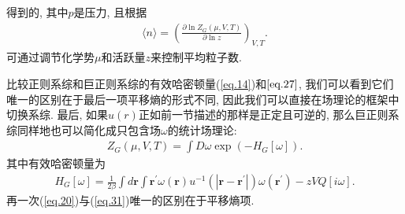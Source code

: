 得到的, 其中$p$是压力, 且根据
\label{subsec.equations}
   \begin{equation}
       \begin{aligned}
           \langle n \rangle=\left(\frac{\partial \ln Z_G(\mu, V, T)}{\partial \ln z}
           \right)_{V, T}.
       \end{aligned}
       \label{eq.29}      
    \end{equation}
可通过调节化学势$\mu$和活跃量$z$来控制平均粒子数.
\par
比较正则系综和巨正则系综的有效哈密顿量(\ref{eq.14})和$\ref{eq.27}$,
我们可以看到它们唯一的区别在于最后一项平移熵的形式不同,
因此我们可以直接在场理论的框架中切换系综. 最后,
如果$u(r)$正如前一节描述的那样是正定且可逆的,
那么巨正则系综同样地也可以简化成只包含场$\omega$的统计场理论:
\label{subsec.equations}
   \begin{equation}
       \begin{aligned}
           Z_G(\mu, V ,T)=\int D\omega \exp(-H_G[\omega]).
       \end{aligned}
       \label{eq.30}      
    \end{equation}
其中有效哈密顿量为
\label{subsec.equations}
   \begin{equation}
       \begin{aligned}
           H_G[\omega]=\frac{1}{2\beta}\int d\bm{r}
           \int\bm{r^{'}}\omega(\bm{r})u^{-1}(|\bm{r}-\bm{r^{'}}|)\omega(\bm{r^{'}})-zVQ[i\omega].
       \end{aligned}
       \label{eq.31}      
    \end{equation}
再一次(\ref{eq.20})与(\ref{eq.31})唯一的区别在于平移熵项.

